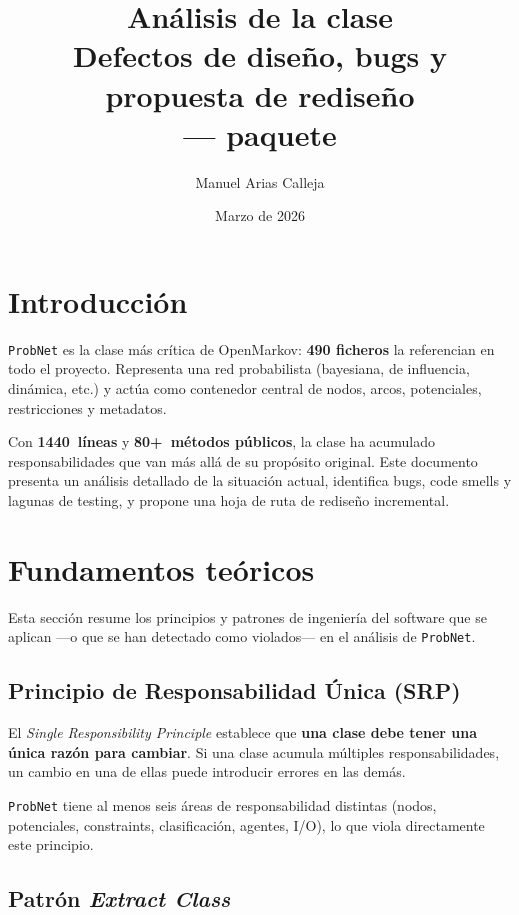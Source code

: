 \documentclass[11pt,a4paper]{article}
\title{An\'alisis de la clase \code{ProbNet}\\
       \large Defectos de dise\~no, bugs y propuesta de redise\~no\\[4pt]
       \normalsize \code{org.openmarkov.core} --- paquete \code{model.network}}
\author{Manuel Arias Calleja}
\date{Marzo de 2026}
\newcommand{\code}[1]{\texttt{#1}}
\begin{document}
\maketitle
\tableofcontents
\newpage

\section{Introducci\'on}

\code{ProbNet} es la clase m\'as cr\'itica de OpenMarkov: \textbf{490
ficheros} la referencian en todo el proyecto.  Representa una red
probabilista (bayesiana, de influencia, din\'amica, etc.) y act\'ua como
contenedor central de nodos, arcos, potenciales, restricciones y
metadatos.

Con \textbf{1440~l\'ineas} y \textbf{80+~m\'etodos p\'ublicos}, la clase
ha acumulado responsabilidades que van m\'as all\'a de su prop\'osito
original.  Este documento presenta un an\'alisis detallado de la
situaci\'on actual, identifica bugs, code smells y lagunas de testing,
y propone una hoja de ruta de redise\~no incremental.

\section{Fundamentos te\'oricos}
\label{sec:teoria}

Esta secci\'on resume los principios y patrones de ingenier\'ia del
software que se aplican ---o que se han detectado como violados--- en el
an\'alisis de \code{ProbNet}.

\subsection{Principio de Responsabilidad \'Unica (SRP)}

El \emph{Single Responsibility Principle} \cite{martin2003} establece
que \textbf{una clase debe tener una \'unica raz\'on para cambiar}.  Si
una clase acumula m\'ultiples responsabilidades, un cambio en una de
ellas puede introducir errores en las dem\'as.

\code{ProbNet} tiene al menos seis \'areas de responsabilidad distintas
(nodos, potenciales, constraints, clasificaci\'on, agentes, I/O), lo que
viola directamente este principio.

\subsection{Patr\'on \emph{Extract Class}}
\end{document}
